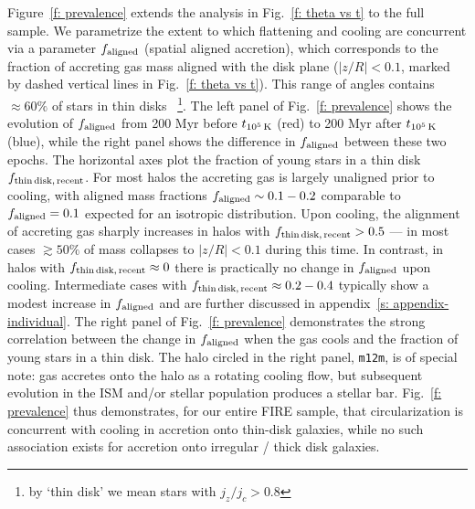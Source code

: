 \documentclass[fleqn,usenatbib]{mnras}
\newcommand{\tcon}{t_{10^5\,{\rm K}}}
\begin{document}
Figure~\ref{f: prevalence} extends the analysis in Fig.~\ref{f: theta vs t} to the full sample.
We parametrize the extent to which flattening and cooling are concurrent via a parameter $f_{\rm aligned}$ (spatial aligned accretion), which corresponds to the fraction of accreting gas mass aligned with the disk plane ($\vert z/R \vert < 0.1$, marked by dashed vertical lines in Fig.~\ref{f: theta vs t}).
This range of angles contains $\approx 60\%$ of stars in thin disks ~\footnote{by `thin disk' we mean stars with $j_z/j_c > 0.8$}.
The left panel of Fig.~\ref{f: prevalence} shows the evolution of $f_{\rm aligned}$ from 200 Myr before $\tcon$ (red) to 200 Myr after $\tcon$ (blue), while the right panel shows the difference in $f_{\rm aligned}$ between these two epochs.
The horizontal axes plot the fraction of young stars in a thin disk $f_{\rm thin\,disk,\,recent}$. 
For most halos the accreting gas is largely unaligned prior to cooling, with aligned mass fractions $f_{\rm aligned}\sim 0.1 - 0.2$ comparable to $f_{\rm aligned} = 0.1$ expected for an isotropic distribution.
Upon cooling, the alignment of accreting gas sharply increases in halos with $f_{\rm thin\,disk,\,recent} > 0.5$ --- in most cases $\gtrsim 50\%$ of mass collapses to $\vert z/R \vert < 0.1$ during this time.
In contrast, in halos with $f_{\rm thin\,disk,\,recent} \approx 0$ there is practically no change in $f_{\rm aligned}$ upon cooling.
Intermediate cases with $f_{\rm thin\,disk,\,recent} \approx 0.2-0.4$ typically show a modest increase in $f_{\rm aligned}$ and are further discussed in appendix~\ref{s: appendix-individual}.
The right panel of Fig.~\ref{f: prevalence} demonstrates the strong correlation between the change in $f_{\rm aligned}$ when the gas cools and the fraction of young stars in a thin disk. The halo circled in the right panel, \texttt{m12m}, is of special note:
gas accretes onto the halo as a rotating cooling flow, but subsequent evolution in the ISM and/or stellar population produces a stellar bar.
Fig.~\ref{f: prevalence} thus demonstrates, for our entire FIRE sample, that circularization is concurrent with cooling in accretion onto thin-disk galaxies, while no such association exists for accretion onto irregular / thick disk galaxies.
\end{document}
